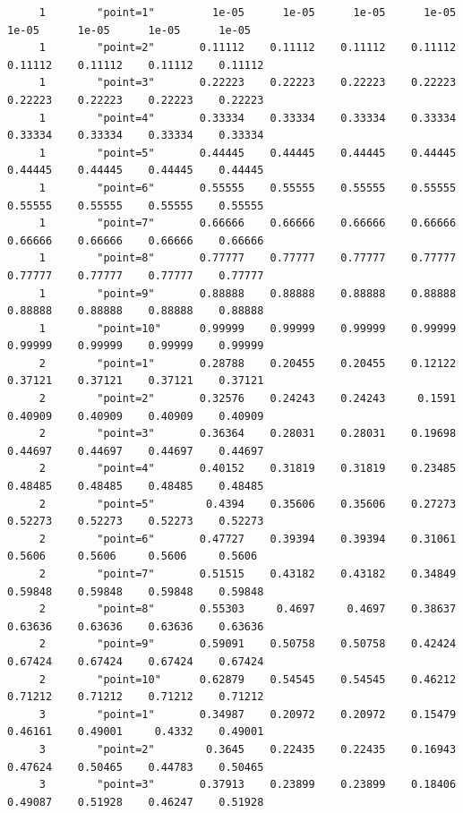 \documentclass[
]{book}
\begin{document}
\begin{verbatim}
     1        "point=1"         1e-05      1e-05      1e-05      1e-05      1e-05      1e-05      1e-05      1e-05
     1        "point=2"       0.11112    0.11112    0.11112    0.11112    0.11112    0.11112    0.11112    0.11112
     1        "point=3"       0.22223    0.22223    0.22223    0.22223    0.22223    0.22223    0.22223    0.22223
     1        "point=4"       0.33334    0.33334    0.33334    0.33334    0.33334    0.33334    0.33334    0.33334
     1        "point=5"       0.44445    0.44445    0.44445    0.44445    0.44445    0.44445    0.44445    0.44445
     1        "point=6"       0.55555    0.55555    0.55555    0.55555    0.55555    0.55555    0.55555    0.55555
     1        "point=7"       0.66666    0.66666    0.66666    0.66666    0.66666    0.66666    0.66666    0.66666
     1        "point=8"       0.77777    0.77777    0.77777    0.77777    0.77777    0.77777    0.77777    0.77777
     1        "point=9"       0.88888    0.88888    0.88888    0.88888    0.88888    0.88888    0.88888    0.88888
     1        "point=10"      0.99999    0.99999    0.99999    0.99999    0.99999    0.99999    0.99999    0.99999
     2        "point=1"       0.28788    0.20455    0.20455    0.12122    0.37121    0.37121    0.37121    0.37121
     2        "point=2"       0.32576    0.24243    0.24243     0.1591    0.40909    0.40909    0.40909    0.40909
     2        "point=3"       0.36364    0.28031    0.28031    0.19698    0.44697    0.44697    0.44697    0.44697
     2        "point=4"       0.40152    0.31819    0.31819    0.23485    0.48485    0.48485    0.48485    0.48485
     2        "point=5"        0.4394    0.35606    0.35606    0.27273    0.52273    0.52273    0.52273    0.52273
     2        "point=6"       0.47727    0.39394    0.39394    0.31061     0.5606     0.5606     0.5606     0.5606
     2        "point=7"       0.51515    0.43182    0.43182    0.34849    0.59848    0.59848    0.59848    0.59848
     2        "point=8"       0.55303     0.4697     0.4697    0.38637    0.63636    0.63636    0.63636    0.63636
     2        "point=9"       0.59091    0.50758    0.50758    0.42424    0.67424    0.67424    0.67424    0.67424
     2        "point=10"      0.62879    0.54545    0.54545    0.46212    0.71212    0.71212    0.71212    0.71212
     3        "point=1"       0.34987    0.20972    0.20972    0.15479    0.46161    0.49001     0.4332    0.49001
     3        "point=2"        0.3645    0.22435    0.22435    0.16943    0.47624    0.50465    0.44783    0.50465
     3        "point=3"       0.37913    0.23899    0.23899    0.18406    0.49087    0.51928    0.46247    0.51928

\end{verbatim}
\end{document}

